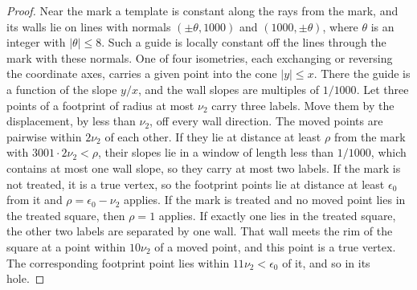 \begin{proof}\leanok
    Near the mark a template is constant along the rays from the mark, and
    its walls lie on lines with normals $(\pm\theta,1000)$ and
    $(1000,\pm\theta)$, where $\theta$ is an integer with $|\theta|\le8$. Such a
    guide is locally constant off the lines through the mark with these
    normals. One of four isometries, each exchanging or reversing the
    coordinate axes, carries a given point into the cone $|y|\le x$. There the
    guide is a function of the slope $y/x$, and the wall slopes are multiples
    of $1/1000$. Let three points of a footprint of radius at most $\nu_2$
    carry three labels. Move them by the displacement, by less than $\nu_2$,
    off every wall direction. The moved points are pairwise within $2\nu_2$
    of each other. If they lie at distance at least $\rho$ from the mark with
    $3001\cdot2\nu_2<\rho$, their slopes lie in a window of length less than
    $1/1000$, which contains at most one wall slope, so they carry at most two
    labels. If the mark is not treated, it is a true vertex, so the footprint
    points lie at distance at least $\epsilon_0$ from it and $\rho=\epsilon_0-\nu_2$
    applies. If the mark is treated and no moved point lies in the treated
    square, then $\rho=1$ applies. If exactly one lies in the treated square,
    the other two labels are separated by one wall. That wall meets the rim of
    the square at a point within $10\nu_2$ of a moved point, and this point is a
    true vertex. The corresponding footprint point lies within
    $11\nu_2<\epsilon_0$ of it, and so in its hole.
\end{proof}

